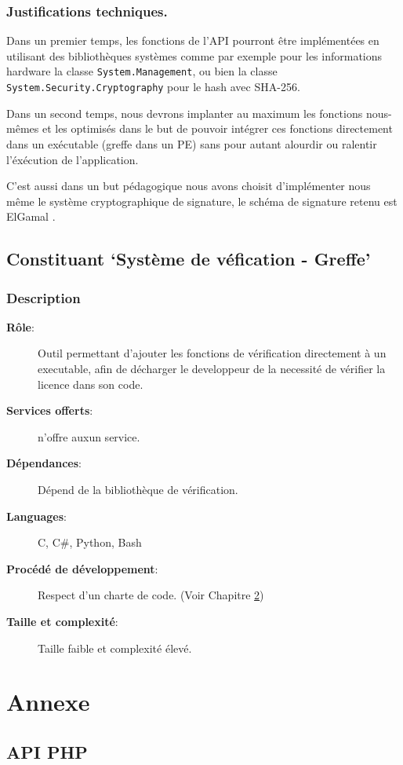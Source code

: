 \subsection{Justifications techniques.}
Dans un premier temps, les fonctions de l'API pourront être implémentées en utilisant des bibliothèques systèmes comme par exemple pour les informations hardware la 
classe \verb:System.Management:, ou bien la classe \verb:System.Security.Cryptography: 
pour le hash avec SHA-256.\newline

Dans un second temps, nous devrons implanter au maximum les fonctions nous-mêmes et 
les optimisés dans le but de pouvoir intégrer ces fonctions directement dans un 
exécutable (greffe dans un PE) sans pour autant alourdir ou ralentir l'éxécution de 
l'application. \newline

C'est aussi dans un but pédagogique nous avons choisit d'implémenter nous même le système cryptographique de signature, le schéma de signature retenu est ElGamal \cite{ElGamal}.

\section{Constituant `Système de véfication - Greffe'}
\subsection{Description}
\begin{description}
	\item[\textbf{Rôle}:]
			Outil permettant d'ajouter les fonctions de vérification directement à un
			executable, afin de décharger le developpeur de la necessité de vérifier 
			la licence dans son code.
	\item[\textbf{Services offerts}:]
		n'offre auxun service.
	\item[\textbf{Dépendances}:]
		Dépend de la bibliothèque de vérification.
	\item[\textbf{Languages}:]
		C, C\#, Python, Bash 
	\item[\textbf{Procédé de développement}:]
		Respect d'un charte de code. (Voir Chapitre \ref{chap:Annexe}) 
	\item[\textbf{Taille et complexité}:]
		Taille faible et complexité élevé.
\end{description}


\chapter{Annexe}
\label{chap:Annexe}



\section{API PHP}
\label{section:php}
\inputminted{php}{api.php}